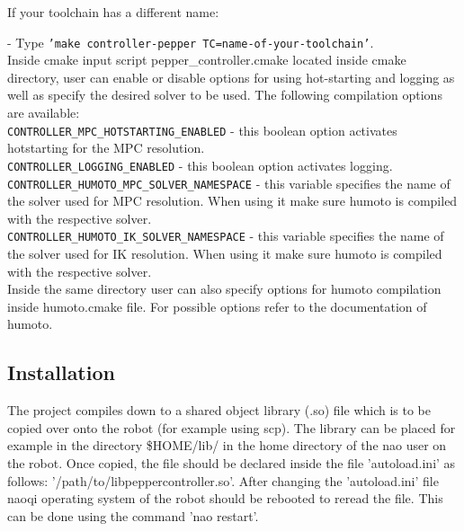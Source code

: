 \noindent If your toolchain has a different name:

- Type \texttt{'make controller-pepper TC=name-of-your-toolchain'}.\\

\noindent Inside cmake input script pepper\_controller.cmake located inside cmake directory, user can enable or disable
options for using hot-starting and logging as well as specify the desired solver to be used. The following compilation
options are available:\\

\noindent \texttt{CONTROLLER\_MPC\_HOTSTARTING\_ENABLED} - this boolean option activates hotstarting for the MPC resolution.\\
\noindent \texttt{CONTROLLER\_LOGGING\_ENABLED} - this boolean option activates logging.\\
\noindent \texttt{CONTROLLER\_HUMOTO\_MPC\_SOLVER\_NAMESPACE} - this variable specifies the name of the solver used for MPC resolution. 
When using it make sure humoto is compiled with the respective solver.\\
\noindent \texttt{CONTROLLER\_HUMOTO\_IK\_SOLVER\_NAMESPACE} - this variable specifies the name of the solver used for IK resolution. 
When using it make sure humoto is compiled with the respective solver.\\

\noindent Inside the same directory user can also specify options for humoto compilation inside humoto.cmake file.
For possible options refer to the documentation of humoto.

\subsection{Installation}
\noindent The project compiles down to a shared object library (.so) file which is to be copied over onto the robot (for example
using scp). The library can be placed for example in the directory \$HOME/lib/ in the home directory of the nao user on the
robot. Once copied, the file should be declared inside the file 'autoload.ini' as follows:
'/path/to/libpeppercontroller.so'. After changing the 'autoload.ini' file naoqi operating system of the robot should be
rebooted to reread the file. This can be done using the command 'nao restart'.

